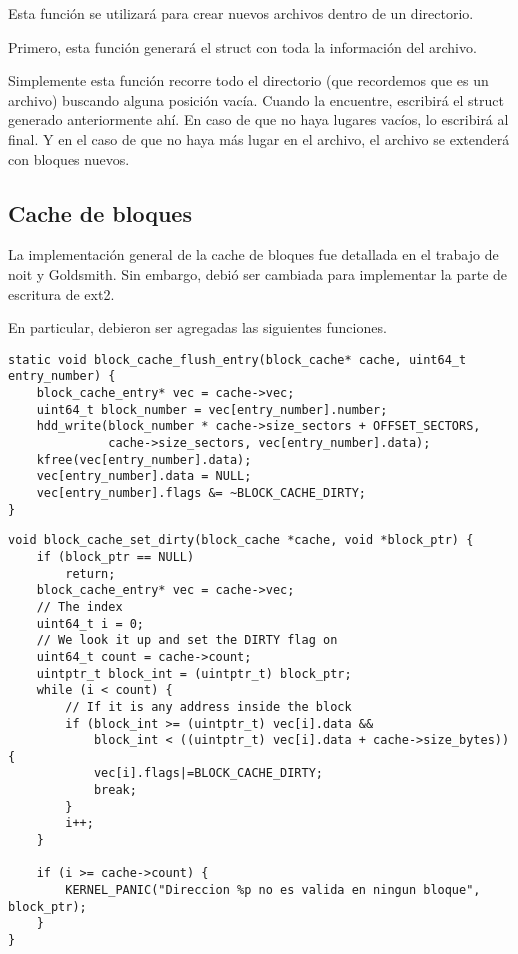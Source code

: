 Esta función se utilizará para crear nuevos archivos dentro de un directorio.

Primero, esta función generará el struct con toda la información del archivo.

Simplemente esta función recorre todo el directorio (que recordemos que es un archivo) buscando alguna posición vacía. Cuando la encuentre, escribirá el struct generado anteriormente ahí. En caso de que no haya lugares vacíos, lo escribirá al final. Y en el caso de que no haya más lugar en el archivo, el archivo se extenderá con bloques nuevos.

\subsection{Cache de bloques}

La implementación general de la cache de bloques fue detallada en el trabajo de noit y Goldsmith. Sin embargo, debió ser cambiada para implementar la parte de escritura de ext2.

En particular, debieron ser agregadas las siguientes funciones.

\begin{lstlisting}[style=customcmucho]
static void block_cache_flush_entry(block_cache* cache, uint64_t entry_number) {
    block_cache_entry* vec = cache->vec;
    uint64_t block_number = vec[entry_number].number;
    hdd_write(block_number * cache->size_sectors + OFFSET_SECTORS, 
              cache->size_sectors, vec[entry_number].data);
    kfree(vec[entry_number].data);
    vec[entry_number].data = NULL;
    vec[entry_number].flags &= ~BLOCK_CACHE_DIRTY;
}
\end{lstlisting}

\begin{lstlisting}[style=customcmucho]
void block_cache_set_dirty(block_cache *cache, void *block_ptr) {
    if (block_ptr == NULL) 
        return;
    block_cache_entry* vec = cache->vec;
    // The index
    uint64_t i = 0;
    // We look it up and set the DIRTY flag on
    uint64_t count = cache->count;
    uintptr_t block_int = (uintptr_t) block_ptr;
    while (i < count) {
        // If it is any address inside the block
        if (block_int >= (uintptr_t) vec[i].data && 
            block_int < ((uintptr_t) vec[i].data + cache->size_bytes)){
            vec[i].flags|=BLOCK_CACHE_DIRTY;
            break;
        }
        i++;
    }

    if (i >= cache->count) {
        KERNEL_PANIC("Direccion %p no es valida en ningun bloque", block_ptr);
    }
}
\end{lstlisting}

